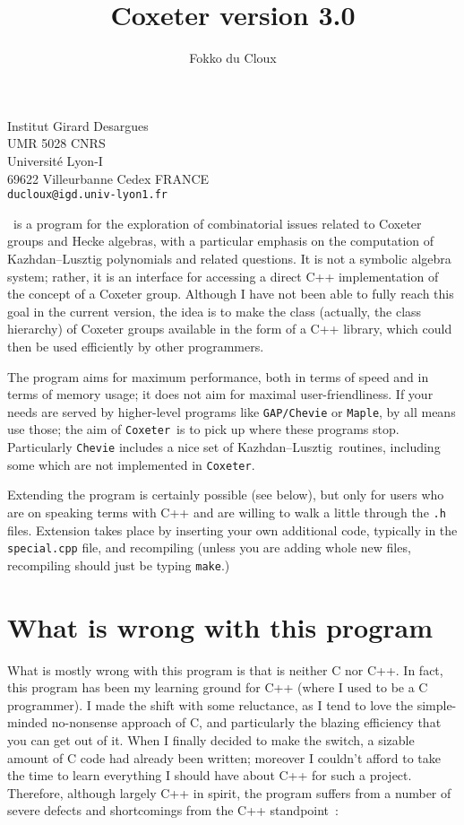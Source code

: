 \documentclass[11pt]{article}
\newcommand{\coxeter}{{\tt Coxeter}}
\newcommand{\kl}{Kazh\-dan--Lusz\-tig}
\newcommand{\klpol}{Kazh\-dan--Lusz\-tig po\-ly\-no\-mial}
\begin{document}
\title{Coxeter version 3.0}
\author{Fokko du Cloux}

\maketitle

\begin{flushleft}
Institut Girard Desargues\\
UMR 5028 CNRS\\
Universit\'e Lyon-I\\
69622 Villeurbanne Cedex FRANCE\\
{\tt ducloux@igd.univ-lyon1.fr}
\end{flushleft}

\noindent\coxeter\ is a program for the exploration of combinatorial issues
related to Coxeter groups and Hecke algebras, with a particular emphasis on
the computation of \klpol s and related questions. It is not a symbolic
algebra system; rather, it is an interface for accessing a direct C++
implementation of the concept of a Coxeter group. Although I have not been
able to fully reach this goal in the current version, the idea is to make the
class (actually, the class hierarchy) of Coxeter groups available in the
form of a C++ library, which could then be used efficiently by other
programmers.

The program aims for maximum performance, both in terms of speed and in terms
of memory usage; it does not aim for maximal user-friendliness. If your needs
are served by higher-level programs like {\tt GAP/Chevie} or {\tt Maple}, by
all means use those; the aim of \coxeter\ is to pick up where these programs
stop. Particularly {\tt Chevie} includes a nice set of \kl\ routines,
including some which are not implemented in \coxeter.

Extending the
program is certainly possible (see below), but only for users who are on
speaking terms with C++ and are willing to walk a little through the {\tt .h}
files. Extension takes place by inserting your own additional code, typically
in the {\tt special.cpp} file, and recompiling (unless you are adding whole
new files, recompiling should just be typing {\tt make}.)

\section{What is wrong with this program}\label{section:wrong}

What is mostly wrong with this program is that is neither C nor C++. In fact,
this program has been my learning ground for C++ (where I used to be a C
programmer). I made the shift with some reluctance, as I tend to love the
simple-minded no-nonsense approach of C, and particularly the blazing
efficiency that you can get out of it. When I finally decided to make the
switch, a sizable amount of C code had already been written; moreover I
couldn't afford to take the time to learn everything I should have about C++
for such a project. Therefore, although largely C++ in spirit, the program
suffers from a number of severe defects and shortcomings from the C++
standpoint~:
\end{document}
